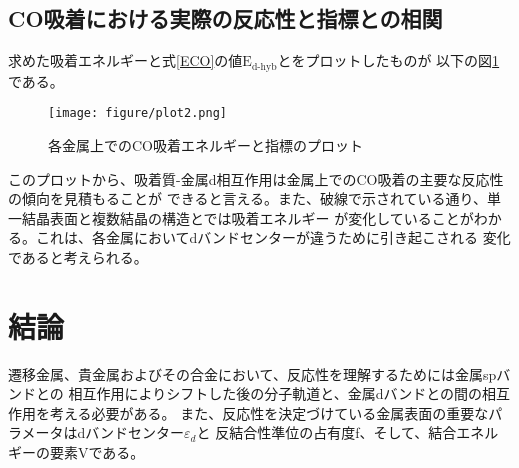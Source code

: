 \documentclass[12pt]{ltjsarticle}
\begin{document}
\subsection{CO吸着における実際の反応性と指標との相関}
求めた吸着エネルギーと式\ref{ECO}の値$\text{E}_\text{d-hyb}$とをプロットしたものが
以下の図\ref{fig:coplot}である。
\begin{figure}[hbtp]
    \begin{center}
     \texttt{[image: figure/plot2.png]}
    \end{center}
    \caption{各金属上でのCO吸着エネルギーと指標のプロット}
    \label{fig:coplot}
\end{figure}

このプロットから、吸着質-金属d相互作用は金属上でのCO吸着の主要な反応性の傾向を見積もることが
できると言える。また、破線で示されている通り、単一結晶表面と複数結晶の構造とでは吸着エネルギー
が変化していることがわかる。これは、各金属においてdバンドセンターが違うために引き起こされる
変化であると考えられる。

\section{結論}
遷移金属、貴金属およびその合金において、反応性を理解するためには金属spバンドとの
相互作用によりシフトした後の分子軌道と、金属dバンドとの間の相互作用を考える必要がある。
また、反応性を決定づけている金属表面の重要なパラメータはdバンドセンター$\varepsilon_d$と
反結合性準位の占有度f、そして、結合エネルギーの要素Vである。



\end{document}
